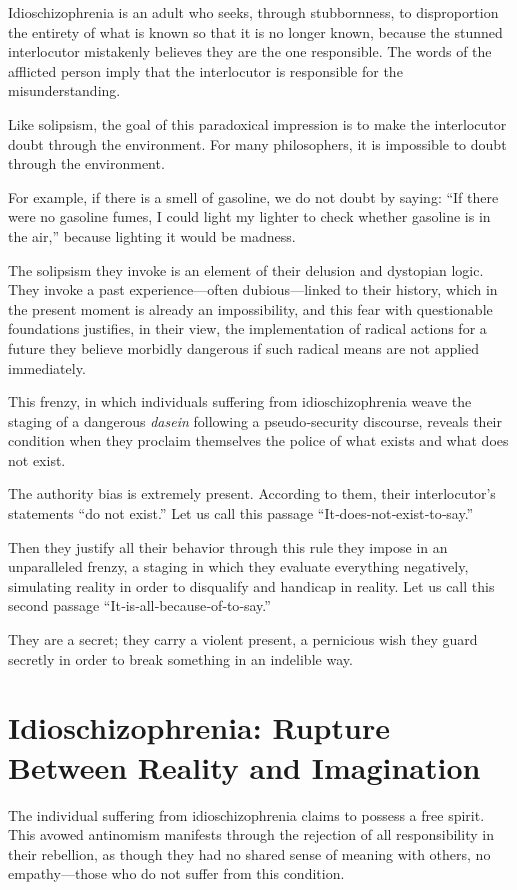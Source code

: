 \documentclass[12pt,oneside]{article}
\begin{document}
Idioschizophrenia is an adult who seeks, through stubbornness, to disproportion the entirety of what is known so that it is no longer known, because the stunned interlocutor mistakenly believes they are the one responsible. The words of the afflicted person imply that the interlocutor is responsible for the misunderstanding.

Like solipsism, the goal of this paradoxical impression is to make the interlocutor doubt through the environment. For many philosophers, it is impossible to doubt through the environment.

For example, if there is a smell of gasoline, we do not doubt by saying: “If there were no gasoline fumes, I could light my lighter to check whether gasoline is in the air,” because lighting it would be madness.

The solipsism they invoke is an element of their delusion and dystopian logic. They invoke a past experience—often dubious—linked to their history, which in the present moment is already an impossibility, and this fear with questionable foundations justifies, in their view, the implementation of radical actions for a future they believe morbidly dangerous if such radical means are not applied immediately.

This frenzy, in which individuals suffering from idioschizophrenia weave the staging of a dangerous \emph{dasein} following a pseudo‑security discourse, reveals their condition when they proclaim themselves the police of what exists and what does not exist.

The authority bias is extremely present. According to them, their interlocutor’s statements “do not exist.” Let us call this passage “It‑does‑not‑exist‑to‑say.”

Then they justify all their behavior through this rule they impose in an unparalleled frenzy, a staging in which they evaluate everything negatively, simulating reality in order to disqualify and handicap in reality. Let us call this second passage “It‑is‑all‑because‑of‑to‑say.”

They are a secret; they carry a violent present, a pernicious wish they guard secretly in order to break something in an indelible way.

\section{Idioschizophrenia: Rupture Between Reality and Imagination}

The individual suffering from idioschizophrenia claims to possess a free spirit. This avowed antinomism manifests through the rejection of all responsibility in their rebellion, as though they had no shared sense of meaning with others, no empathy—those who do not suffer from this condition.
\end{document}
